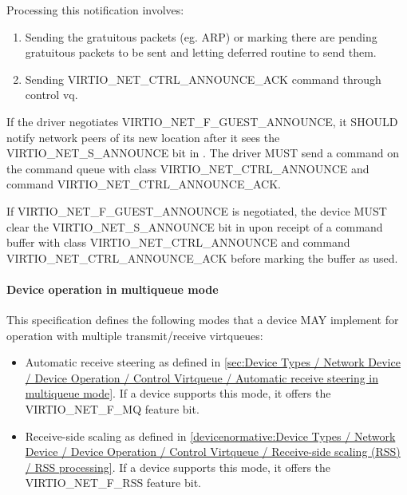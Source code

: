Processing this notification involves:

\begin{enumerate}
\item Sending the gratuitous packets (eg. ARP) or marking there are pending
  gratuitous packets to be sent and letting deferred routine to
  send them.

\item Sending VIRTIO_NET_CTRL_ANNOUNCE_ACK command through control
  vq.
\end{enumerate}


If the driver negotiates VIRTIO_NET_F_GUEST_ANNOUNCE, it SHOULD notify
network peers of its new location after it sees the VIRTIO_NET_S_ANNOUNCE bit
in .  The driver MUST send a command on the command queue
with class VIRTIO_NET_CTRL_ANNOUNCE and command VIRTIO_NET_CTRL_ANNOUNCE_ACK.


If VIRTIO_NET_F_GUEST_ANNOUNCE is negotiated, the device MUST clear the
VIRTIO_NET_S_ANNOUNCE bit in  upon receipt of a command buffer
with class VIRTIO_NET_CTRL_ANNOUNCE and command VIRTIO_NET_CTRL_ANNOUNCE_ACK
before marking the buffer as used.

\paragraph{Device operation in multiqueue mode}\label{sec:Device Types / Network Device / Device Operation / Control Virtqueue / Device operation in multiqueue mode}

This specification defines the following modes that a device MAY implement for operation with multiple transmit/receive virtqueues:
\begin{itemize}
\item Automatic receive steering as defined in \ref{sec:Device Types / Network Device / Device Operation / Control Virtqueue / Automatic receive steering in multiqueue mode}.
 If a device supports this mode, it offers the VIRTIO_NET_F_MQ feature bit.
\item Receive-side scaling as defined in \ref{devicenormative:Device Types / Network Device / Device Operation / Control Virtqueue / Receive-side scaling (RSS) / RSS processing}.
 If a device supports this mode, it offers the VIRTIO_NET_F_RSS feature bit.
\end{itemize}

